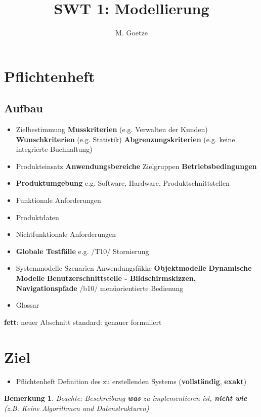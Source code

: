 \documentclass[a4paper]{article}
\title{SWT 1: Modellierung}
\author{M. Goetze}
\theoremstyle{break}
\newtheorem{ann}{Bemerkung}[section]
\begin{document}
	\maketitle
	\tableofcontents
	\newpage
\section{Pflichtenheft}
\subsection{Aufbau}
	\begin{itemize}
		\item Zielbestimmung
		\subitem \textbf{Musskriterien} (e.g. Verwalten der Kunden)
		\subitem \textbf{Wunschkriterien} (e.g. Statistik)
		\subitem \textbf{Abgrenzungskriterien} (e.g. keine integrierte Buchhaltung)
		\item Produkteinsatz
		\subitem \textbf{Anwendungsbereiche}
		\subitem Zielgruppen
		\subitem \textbf{Betriebsbedingungen}
		\item \textbf{Produktumgebung}
		\subitem e.g. Software, Hardware, Produktschnittstellen
		\item Funktionale Anforderungen
		\item Produktdaten
		\item Nichtfunktionale Anforderungen
		\item \textbf{Globale Testfälle}
		\subitem e.g. /T10/ Stornierung
		\item Systemmodelle
		\subitem Szenarien
		\subitem Anwendungsfäkke
		\subitem \textbf{Objektmodelle}
		\subitem \textbf{Dynamische Modelle}
		\subitem \textbf{Benutzerschnittstelle - Bildschirmskizzen, Navigationspfade}
		\subitem /b10/ menüorientierte Bedienung
		\item Glossar
	\end{itemize}

	\textbf{fett}: neuer Abschnitt
	standard: genauer formuliert
\section{Ziel}
\begin{itemize}
	\item Pflichtenheft
	\subitem Definition des zu erstellenden Systems (\textbf{vollständig}, \textbf{exakt})
\end{itemize}
\begin{ann}
	Beachte: Beschreibung \textbf{was} zu implementieren ist, \textbf{nicht wie} (z.B. Keine Algorithmen und Datenstrukturen)
\end{ann}
\end{document}

